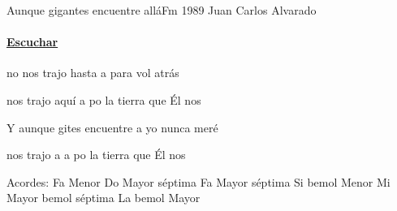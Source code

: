 \documentclass[12pt, spanish]{book}
\begin{document}
    \begin{song}{Aunque gigantes encuentre allá}{Fm}
    {1989} %
    {Juan Carlos Alvarado}
    {} %
    {}
        \ifChordBk
        \paragraph{\mbox{}\hfill\protect\href{https://open.spotify.com/intl-es/track/3T0iYGSm7o5X9uVWNcDNz3}{Escuchar}\mbox{}\hfill}
        \fi


        \begin{SBChorus}
             no nos trajo hasta a para vol atrás

            nos trajo aquí a po la tierra que Él nos 
        \end{SBChorus}

        \begin{SBOpGroup}
            Y aunque gites encuentre a yo nunca meré

            nos trajo a a po la tierra que Él nos 
        \end{SBOpGroup}

        \ifChordBk
        \begin{SBOpGroup}
            Acordes:
            \upchord{\Fm}\qquad Fa Menor \hfill
            \upchord{\Cseven}\qquad Do Mayor s\'eptima \hfill\null\break
            \upchord{\Fseven}\qquad Fa Mayor s\'eptima \hfill
            \upchord{\Bflatm}\qquad Si bemol Menor \hfill\null\break
            \upchord{\Eflatseven}\qquad Mi Mayor bemol s\'eptima \hfill
            \upchord{\Aflat}\qquad La bemol Mayor \hfill\null\break
        \end{SBOpGroup}
        \fi
    \end{song}
\end{document}
